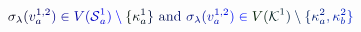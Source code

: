 \documentclass[12pt]{article}
\begin{document}
\makeatletter
\renewcommand*{\@textcolor}[3]{%
  \protect\leavevmode
  \begingroup
    \color#1{#2}#3%
  \endgroup
}
\makeatother
\begin{displaymath}
\mathcolor[RGB]{0,0,15}{\sigma} _ { \mathcolor[RGB]{0,0,30}{\lambda} } \mathcolor[RGB]{0,0,45}{(} \mathcolor[RGB]{0,0,60}{v} _ { \mathcolor[RGB]{0,0,75}{a} } ^ { \mathcolor[RGB]{0,0,90}{1} \mathcolor[RGB]{0,0,105}{,} \mathcolor[RGB]{0,0,120}{2} } \mathcolor[RGB]{0,0,135}{)} \mathcolor[RGB]{0,0,150}{\in} \mathcolor[RGB]{0,0,165}{V} \mathcolor[RGB]{0,0,180}{(} \mathcal { \mathcolor[RGB]{0,0,195}{S} } _ { \mathcolor[RGB]{0,0,210}{a} } ^ { \mathcolor[RGB]{0,0,225}{1} } \mathcolor[RGB]{0,0,240}{)} \mathcolor[RGB]{0,0,255}{\setminus} \mathcolor[RGB]{0,15,0}{\{} \mathcolor[RGB]{0,15,15}{\kappa} _ { \mathcolor[RGB]{0,15,30}{a} } ^ { \mathcolor[RGB]{0,15,45}{1} } \mathcolor[RGB]{0,15,60}{\}} \mathrm { ~ \mathcolor[RGB]{0,15,75}{a} \mathcolor[RGB]{0,15,90}{n} \mathcolor[RGB]{0,15,105}{d} ~ } \mathcolor[RGB]{0,15,120}{\sigma} _ { \mathcolor[RGB]{0,15,135}{\lambda} } \mathcolor[RGB]{0,15,150}{(} \mathcolor[RGB]{0,15,165}{v} _ { \mathcolor[RGB]{0,15,180}{a} } ^ { \mathcolor[RGB]{0,15,195}{1} \mathcolor[RGB]{0,15,210}{,} \mathcolor[RGB]{0,15,225}{2} } \mathcolor[RGB]{0,15,240}{)} \mathcolor[RGB]{0,15,255}{\in} \mathcolor[RGB]{0,30,0}{V} \mathcolor[RGB]{0,30,15}{(} \mathcal { \mathcolor[RGB]{0,30,30}{K} } ^ { \mathcolor[RGB]{0,30,45}{1} } \mathcolor[RGB]{0,30,60}{)} \mathcolor[RGB]{0,30,75}{\setminus} \mathcolor[RGB]{0,30,90}{\{} \mathcolor[RGB]{0,30,105}{\kappa} _ { \mathcolor[RGB]{0,30,120}{a} } ^ { \mathcolor[RGB]{0,30,135}{2} } \mathcolor[RGB]{0,30,150}{,} \mathcolor[RGB]{0,30,165}{\kappa} _ { \mathcolor[RGB]{0,30,180}{b} } ^ { \mathcolor[RGB]{0,30,195}{2} } \mathcolor[RGB]{0,30,210}{\}}
\end{displaymath}
\end{document}
